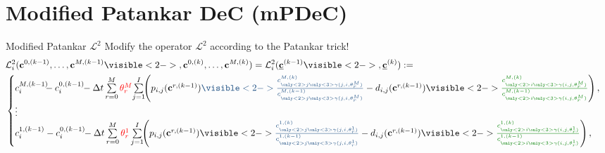 \documentclass[aspectratio=169]{beamer}
\newcommand{\1}{\begin{pmatrix}
                 1\\
                 1
                \end{pmatrix}}
\def\L{\mathcal{L}}
\def\bbc{\underline{\mathbf{c}}}
\def\bc{\mathbf{c}}
\begin{document}
\section{Modified Patankar DeC (mPDeC)}
\begin{frame}{Modified Patankar $\L^2$}
Modify the operator $\L^2$ according to the Patankar trick!
\begin{equation*}\label{eq:L2m}
\!\!\begin{split}
&\L_i^2(\bc^{0,(k-1)}, \dots, \bc^{M,(k-1)}\visible<2->{,\bc^{0,(k)}, \dots, \bc^{M,(k)}}) =\L_i^2(\bbc^{(k-1)}\visible<2->{,\bbc^{(k)}}):=\\
&\begin{cases}
c_i^{M,(k-1)} \!\!\!-c_i^{0,(k-1)}\!\! -\Delta t \sum\limits_{r=0}^M {\color{red}\theta_r^M}  \! \sum\limits_{j=1}^I \!\! \left(   p_{i,j}(\bc^{r,(k-1)}) {\color{lightblue}\visible<2->{\frac{c^{M,(k)}_{\only<2>{j}\only<3>{\gamma(j,i, \theta_r^M)}}}{c_{\only<2>{j}\only<3>{\gamma(j,i, \theta_r^M)}}^{M,(k-1)}}}} -  d_{i,j}(\bc^{r,(k-1)})  \visible<2->{{\color{lightgreen}\frac{c^{M,(k)}_{\only<2>{i}\only<3>{\gamma(i,j, \theta_r^M)}}}{c_{\only<2>{i}\only<3>{\gamma(i,j, \theta_r^M)}}^{M,(k-1)}}}} \right),\\
\vdots\\
c_i^{1,(k-1)}-c_i^{0,(k-1)} \!\!- \Delta t  \sum\limits_{r=0}^M {\color{red}\theta_r^1} \sum\limits_{j=1}^I \!\!
\left(  p_{i,j}(\bc^{r,(k-1)}) \visible<2->{{\color{lightblue}\frac{c^{1,(k)}_{\only<2>{j}\only<3>{\gamma(j,i, \theta_r^1)}}}{c_{\only<2>{j}\only<3>{\gamma(j,i, \theta_r^1)}}^{1,(k-1)}}}} -  d_{i,j}(\bc^{r,(k-1)})  \visible<2->{{\color{lightgreen}\frac{c^{1,(k)}_{\only<2>{i}\only<3>{\gamma(i,j, \theta_r^1)}}}{c_{\only<2>{i}\only<3>{\gamma(i,j, \theta_r^1)}}^{1,(k-1)}}}} \right),
\end{cases}
\end{split}
\end{equation*}
\end{frame}
\end{document}
